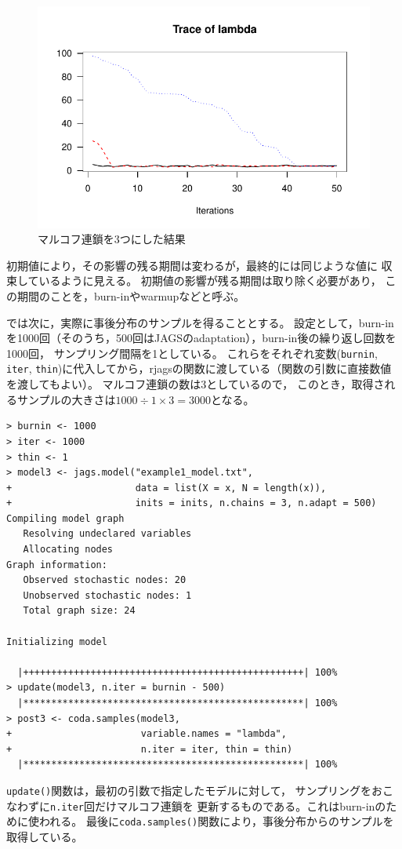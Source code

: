 \documentclass[11pt,uplatex]{jsarticle}
\begin{document}
\begin{figure}[hbtp]
  \begin{center}
    \includegraphics[bb=0 0 360 240, clip, width=260 bp]{example1-2.pdf}
  \end{center}
  \caption{マルコフ連鎖を3つにした結果}
  \label{fig:trace3}
\end{figure}\noindent

初期値により，その影響の残る期間は変わるが，最終的には同じような値に
収束しているように見える。
初期値の影響が残る期間は取り除く必要があり，
この期間のことを，burn-inやwarmupなどと呼ぶ。

では次に，実際に事後分布のサンプルを得ることとする。
設定として，burn-inを1000回（そのうち，500回は\textsf{JAGS}のadaptation），burn-in後の繰り返し回数を1000回，
サンプリング間隔を1としている。
これらをそれぞれ変数(\texttt{burnin}, \texttt{iter}, \texttt{thin})に代入してから，\textsf{rjags}の関数に渡している（関数の引数に直接数値を渡してもよい）。
マルコフ連鎖の数は3としているので，
このとき，取得されるサンプルの大きさは$1000 \div 1 \times 3 = 3000$となる。

\begin{lstlisting}
> burnin <- 1000
> iter <- 1000
> thin <- 1
> model3 <- jags.model("example1_model.txt",
+                      data = list(X = x, N = length(x)),
+                      inits = inits, n.chains = 3, n.adapt = 500)
Compiling model graph
   Resolving undeclared variables
   Allocating nodes
Graph information:
   Observed stochastic nodes: 20
   Unobserved stochastic nodes: 1
   Total graph size: 24

Initializing model

  |++++++++++++++++++++++++++++++++++++++++++++++++++| 100%
> update(model3, n.iter = burnin - 500)
  |**************************************************| 100%
> post3 <- coda.samples(model3,
+                       variable.names = "lambda",
+                       n.iter = iter, thin = thin)
  |**************************************************| 100%
\end{lstlisting}
%
\texttt{update()}関数は，最初の引数で指定したモデルに対して，
サンプリングをおこなわずに\texttt{n.iter}回だけマルコフ連鎖を
更新するものである。これはburn-inのために使われる。
最後に\texttt{coda.samples()}関数により，事後分布からのサンプルを取得している。
\end{document}
